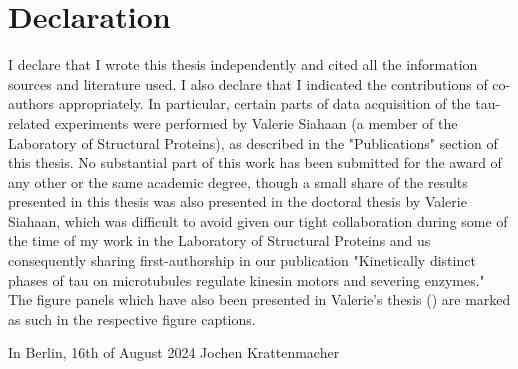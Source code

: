\chapter*{Declaration}
I declare that I wrote this thesis independently and cited all the information sources and literature used. I also declare that I indicated the contributions of co-authors appropriately. In particular, certain parts of data acquisition of the tau-related experiments were performed by Valerie Siahaan (a member of the Laboratory of Structural Proteins), as described in the "Publications" section of this thesis. No substantial part of this work has been submitted for the award of any other or the same academic degree, though a small share of the results presented in this thesis was also presented in the doctoral thesis by Valerie Siahaan, which was difficult to avoid given our tight collaboration during some of the time of my work in the Laboratory of Structural Proteins and us consequently sharing first-authorship in our publication "Kinetically distinct phases of tau on microtubules regulate kinesin motors and severing enzymes." The figure panels which have also been presented in Valerie's thesis (\cite{Siahaan}) are marked as such in the respective figure captions.\\

\begin{minipage}{5in}
    \vspace{0.5in}
    In Berlin, 16th of August 2024 \hfill Jochen Krattenmacher
\end{minipage}